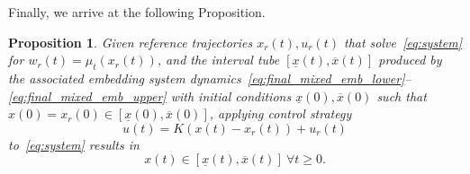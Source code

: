 \documentclass{IEEEojcsys}
\newcommand{\ul}{\underline}
\newtheorem{prop}{Proposition}
\newcommand{\ol}{\overline}
\begin{document}
Finally, we arrive at the following Proposition.
\begin{prop}
\label{prop:1}
    Given reference trajectories $x_r(t), u_r(t)$ that solve~\eqref{eq:system} for $w_r(t) = \mu_t(x_r(t))$, and the interval tube $[\ul{x}(t), \ol{x}(t)]$ produced by the associated embedding system dynamics~\eqref{eq:final_mixed_emb_lower}--\eqref{eq:final_mixed_emb_upper} with initial conditions $\ul{x}(0), \ol{x}(0)$ such that $x(0) = x_r(0)\in[\ul{x}(0), \ol{x}(0)]$, applying control strategy
    \begin{equation}
    \label{eq:control_strategy}
        u(t) = K(x(t) - x_r(t)) + u_r(t)
    \end{equation}
    to~\eqref{eq:system} results in
    \begin{equation}
    \label{eq:prop_1}
        x(t) \in [\ul{x}(t), \ol{x}(t)] \ \forall t\geq0.
    \end{equation}
\end{prop}
\end{document}
